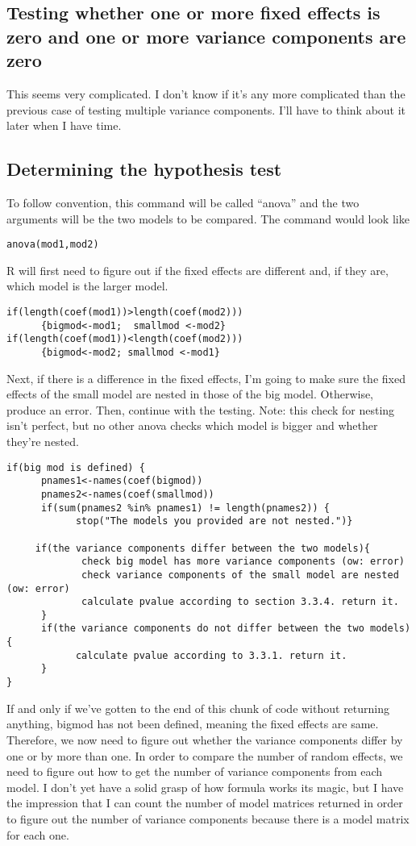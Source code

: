 \documentclass{article}
\begin{document}
 \subsection{Testing whether one or more fixed effects is zero and one or more variance components are zero}\label{sec:combotest}
 This seems very complicated. I don't know if it's any more complicated than the previous case of testing multiple variance components. I'll have to think about it later when I have time.
 
 \subsection{Determining the hypothesis test}
 To follow convention, this command will be called ``anova'' and the two arguments will be the two models to be compared.  The command would look like
\begin{verbatim}
anova(mod1,mod2)
\end{verbatim} 

 R will first need to figure out if the fixed effects are different and, if they are, which model is the larger model.
\begin{verbatim}
if(length(coef(mod1))>length(coef(mod2)))
      {bigmod<-mod1;  smallmod <-mod2} 
if(length(coef(mod1))<length(coef(mod2)))
      {bigmod<-mod2; smallmod <-mod1}
\end{verbatim}
Next, if there is a difference in the fixed effects, I'm going to make sure the fixed effects of the small model are nested in those of the big model. Otherwise, produce an error. Then, continue with the testing. Note: this check for nesting isn't perfect, but no other anova checks which model is bigger and whether they're nested.
\begin{verbatim}
if(big mod is defined) {
      pnames1<-names(coef(bigmod))
      pnames2<-names(coef(smallmod))
      if(sum(pnames2 %in% pnames1) != length(pnames2)) {
            stop("The models you provided are not nested.")}

     if(the variance components differ between the two models){
             check big model has more variance components (ow: error)
             check variance components of the small model are nested (ow: error)
             calculate pvalue according to section 3.3.4. return it.
      }
      if(the variance components do not differ between the two models){
            calculate pvalue according to 3.3.1. return it.
      }
}
\end{verbatim}
If and only if we've gotten to the end of this chunk of code without returning anything, bigmod has not been defined, meaning the fixed effects are same. Therefore, we now need to figure out whether the variance components differ by one or by more than one. In order to compare the number of random effects, we need to figure out how to get the number of variance components from each model. I  don't yet have a solid grasp of how formula works its magic, but I have the impression that I can count the number of model matrices returned in order to figure out the number of variance components because there is a model matrix for each one.
\end{document}
